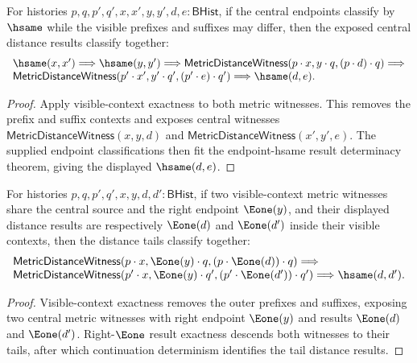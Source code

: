 \begin{theorem}
\label{thm:metric-distance-witness-visible-context-prefix-independent-endpoint-hsame-result-deterministic}
For histories $p,q,p',q',x,x',y,y',d,e:\mathsf{BHist}$, if the central
endpoints classify by $\hsame$ while the visible prefixes and suffixes may
differ, then the exposed central distance results classify together:
$$
\begin{array}{l}
\hsame(x,x')\Longrightarrow
\hsame(y,y')\Longrightarrow
\mathsf{MetricDistanceWitness}(p\cdot x,y\cdot q,(p\cdot d)\cdot q)
\Longrightarrow
\\
\mathsf{MetricDistanceWitness}(p'\cdot x',y'\cdot q',(p'\cdot e)\cdot q')
\Longrightarrow
\hsame(d,e).
\end{array}
$$
\end{theorem}
\begin{proof}
Apply visible-context exactness to both metric witnesses. This removes the
prefix and suffix contexts and exposes central witnesses
$\mathsf{MetricDistanceWitness}(x,y,d)$ and
$\mathsf{MetricDistanceWitness}(x',y',e)$. The supplied endpoint
classifications then fit the endpoint-hsame result determinacy theorem, giving
the displayed $\hsame(d,e)$.
\end{proof}

\begin{theorem}
\label{thm:metric-distance-witness-visible-context-right-e1-result-tail-deterministic}
For histories $p,q,p',q',x,y,d,d':\mathsf{BHist}$, if two visible-context
metric witnesses share the central source and the right endpoint
$\Eone(y)$, and their displayed distance results are respectively
$\Eone(d)$ and $\Eone(d')$ inside their visible contexts, then the distance
tails classify together:
$$
\begin{array}{l}
\mathsf{MetricDistanceWitness}(p\cdot x,\Eone(y)\cdot q,(p\cdot\Eone(d))\cdot q)
\Longrightarrow
\\
\mathsf{MetricDistanceWitness}(p'\cdot x,\Eone(y)\cdot q',(p'\cdot\Eone(d'))\cdot q')
\Longrightarrow
\hsame(d,d').
\end{array}
$$
\end{theorem}
\begin{proof}
Visible-context exactness removes the outer prefixes and suffixes, exposing two
central metric witnesses with right endpoint $\Eone(y)$ and results
$\Eone(d)$ and $\Eone(d')$. Right-\(\Eone\) result exactness descends both
witnesses to their tails, after which continuation determinism identifies the
tail distance results.
\end{proof}

